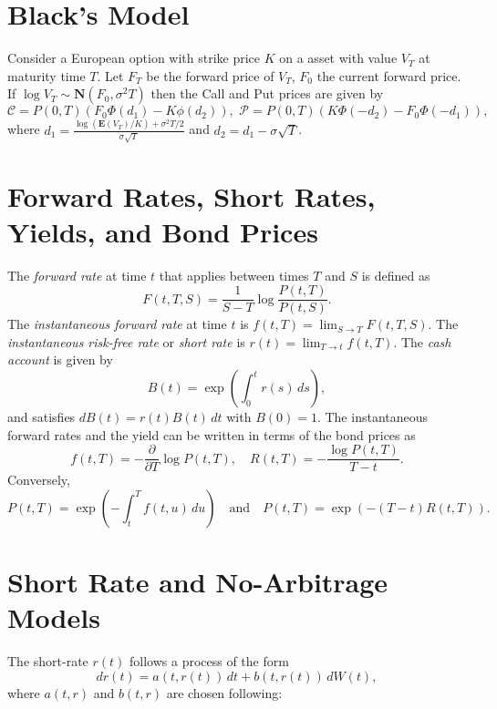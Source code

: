 \documentclass[twocolumn]{amsart}
\newcommand{\E}{\mathbf{E}}
\newcommand{\Normal}{\mathbf{N}}
\newcommand{\Call}{\mathcal{C}}
\newcommand{\Put}{\mathcal{P}}
\begin{document}
\section*{Black's Model}

Consider a European option with strike price $K$ on a asset with value $V_T$ at maturity time $T$. Let $F_T$ be the forward price of $V_T$, $F_0$ the current forward price. If $\log V_T \sim \Normal(F_0, \sigma^2 T)$ then the Call and Put prices are given by
\begin{equation*}
\Call = P(0,T) (F_0 \Phi(d_1) - K \phi(d_2)), \,\, \Put = P(0,T) (K \Phi(-d_2) - F_0 \Phi(-d_1)),
\end{equation*}
where $\displaystyle d_1 = \frac{\log(\E(V_T)/K) + \sigma^2T/2}{\sigma \sqrt{T}}$ and $d_2 = d_1 - \sigma \sqrt{T}$.

\section*{Forward Rates, Short Rates, Yields, and Bond Prices}

The \emph{forward rate} at time $t$ that applies between times $T$ and $S$ is defined as
\begin{equation*}
    F(t,T,S) = \frac{1}{S-T}\log \frac{P(t,T)}{P(t,S)}.
\end{equation*}
The \emph{instantaneous forward rate} at time $t$ is $f(t,T) = \lim_{S \to T} F(t,T,S)$. The \emph{instantaneous risk-free rate} or \emph{short rate} is $r(t) = \lim_{T \to t} f(t,T)$. The \emph{cash account} is given by
\begin{equation*}
    B(t) = \exp\left(\int_0^t r(s)\,ds\right),
\end{equation*}
and satisfies $dB(t) = r(t) B(t)\,dt$ with $B(0)=1$. The instantaneous forward rates and the yield can be written in terms of the bond prices as
\[ f(t,T) = - \frac{\partial}{\partial T} \log P(t,T), \quad R(t,T) = - \frac{\log P(t,T)}{T-t}. \]
Conversely,
\[ P(t,T) = \exp \left(- \int_t^T f(t,u)\,du \right)\quad \text{and} \quad P(t,T) = \exp(-(T-t)R(t,T)). \]

\section*{Short Rate and No-Arbitrage Models}

The short-rate $r(t)$ follows a process of the form
\[ dr(t) = a(t,r(t))\,dt + b(t,r(t))\,dW(t),  \]
where $a(t,r)$ and $b(t,r)$ are chosen following:
\end{document}
